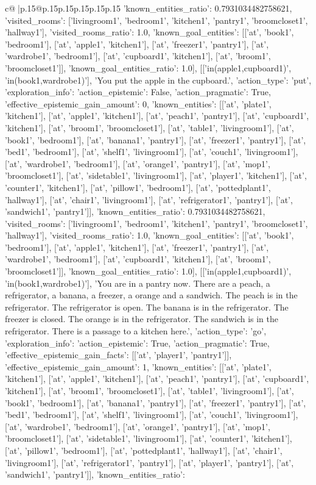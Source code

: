 \documentclass{article}
\begin{document}
{\begin{supertabular}{c@{$\;$}|p{.15\linewidth}@{}p{.15\linewidth}p{.15\linewidth}p{.15\linewidth}p{.15\linewidth}p{.15\linewidth}}
{{{'known_entities_ratio': 0.7931034482758621, 'visited_rooms': ['livingroom1', 'bedroom1', 'kitchen1', 'pantry1', 'broomcloset1', 'hallway1'], 'visited_rooms_ratio': 1.0, 'known_goal_entities': [['at', 'book1', 'bedroom1'], ['at', 'apple1', 'kitchen1'], ['at', 'freezer1', 'pantry1'], ['at', 'wardrobe1', 'bedroom1'], ['at', 'cupboard1', 'kitchen1'], ['at', 'broom1', 'broomcloset1']], 'known_goal_entities_ratio': 1.0}}], [['in(apple1,cupboard1)', 'in(book1,wardrobe1)'], 'You put the apple in the cupboard.', {'action_type': 'put', 'exploration_info': {'action_epistemic': False, 'action_pragmatic': True, 'effective_epistemic_gain_amount': 0, 'known_entities': [['at', 'plate1', 'kitchen1'], ['at', 'apple1', 'kitchen1'], ['at', 'peach1', 'pantry1'], ['at', 'cupboard1', 'kitchen1'], ['at', 'broom1', 'broomcloset1'], ['at', 'table1', 'livingroom1'], ['at', 'book1', 'bedroom1'], ['at', 'banana1', 'pantry1'], ['at', 'freezer1', 'pantry1'], ['at', 'bed1', 'bedroom1'], ['at', 'shelf1', 'livingroom1'], ['at', 'couch1', 'livingroom1'], ['at', 'wardrobe1', 'bedroom1'], ['at', 'orange1', 'pantry1'], ['at', 'mop1', 'broomcloset1'], ['at', 'sidetable1', 'livingroom1'], ['at', 'player1', 'kitchen1'], ['at', 'counter1', 'kitchen1'], ['at', 'pillow1', 'bedroom1'], ['at', 'pottedplant1', 'hallway1'], ['at', 'chair1', 'livingroom1'], ['at', 'refrigerator1', 'pantry1'], ['at', 'sandwich1', 'pantry1']], 'known_entities_ratio': 0.7931034482758621, 'visited_rooms': ['livingroom1', 'bedroom1', 'kitchen1', 'pantry1', 'broomcloset1', 'hallway1'], 'visited_rooms_ratio': 1.0, 'known_goal_entities': [['at', 'book1', 'bedroom1'], ['at', 'apple1', 'kitchen1'], ['at', 'freezer1', 'pantry1'], ['at', 'wardrobe1', 'bedroom1'], ['at', 'cupboard1', 'kitchen1'], ['at', 'broom1', 'broomcloset1']], 'known_goal_entities_ratio': 1.0}}], [['in(apple1,cupboard1)', 'in(book1,wardrobe1)'], 'You are in a pantry now. There are a peach, a refrigerator, a banana, a freezer, a orange and a sandwich. The peach is in the refrigerator. The refrigerator is open. The banana is in the refrigerator. The freezer is closed. The orange is in the refrigerator. The sandwich is in the refrigerator. There is a passage to a kitchen here.', {'action_type': 'go', 'exploration_info': {'action_epistemic': True, 'action_pragmatic': True, 'effective_epistemic_gain_facts': [['at', 'player1', 'pantry1']], 'effective_epistemic_gain_amount': 1, 'known_entities': [['at', 'plate1', 'kitchen1'], ['at', 'apple1', 'kitchen1'], ['at', 'peach1', 'pantry1'], ['at', 'cupboard1', 'kitchen1'], ['at', 'broom1', 'broomcloset1'], ['at', 'table1', 'livingroom1'], ['at', 'book1', 'bedroom1'], ['at', 'banana1', 'pantry1'], ['at', 'freezer1', 'pantry1'], ['at', 'bed1', 'bedroom1'], ['at', 'shelf1', 'livingroom1'], ['at', 'couch1', 'livingroom1'], ['at', 'wardrobe1', 'bedroom1'], ['at', 'orange1', 'pantry1'], ['at', 'mop1', 'broomcloset1'], ['at', 'sidetable1', 'livingroom1'], ['at', 'counter1', 'kitchen1'], ['at', 'pillow1', 'bedroom1'], ['at', 'pottedplant1', 'hallway1'], ['at', 'chair1', 'livingroom1'], ['at', 'refrigerator1', 'pantry1'], ['at', 'player1', 'pantry1'], ['at', 'sandwich1', 'pantry1']], 'known_entities_ratio': }}}
\end{supertabular}}
\end{document}
